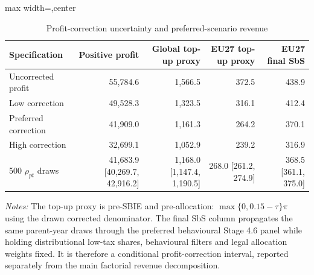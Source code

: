 \begin{table}[H]
\centering
\footnotesize
\setlength{\tabcolsep}{3pt}
\caption{Profit-correction uncertainty and preferred-scenario revenue}
\label{tab:profit_correction_revenue_sensitivity}
\begin{adjustbox}{max width=\textwidth,center}
\begin{tabular}{@{}lrrrr@{}}
\toprule
Specification & Positive profit & Global top-up proxy & EU27 top-up proxy & EU27 final SbS \\
\midrule
Uncorrected profit & 55,784.6 & 1,566.5 & 372.5 & 438.9 \\
Low correction & 49,528.3 & 1,323.5 & 316.1 & 412.4 \\
Preferred correction & 41,909.0 & 1,161.3 & 264.2 & 370.1 \\
High correction & 32,699.1 & 1,052.9 & 239.2 & 316.9 \\
500 $\rho_{pt}$ draws & 41,683.9 [40,269.7, 42,916.2] & 1,168.0 [1,147.4, 1,190.5] & 268.0 [261.2, 274.9] & 368.5 [361.1, 375.0] \\
\bottomrule
\end{tabular}
\end{adjustbox}

\vspace{0.35em}
\noindent\begin{minipage}{\textwidth}
\footnotesize\raggedright\textit{Notes:} The top-up proxy is pre-SBIE and pre-allocation: $\max\{0,0.15-\tau\}\pi$ using the drawn corrected denominator. The final SbS column propagates the same parent-year draws through the preferred behavioural Stage 4.6 panel while holding distributional low-tax shares, behavioural filters and legal allocation weights fixed. It is therefore a conditional profit-correction interval, reported separately from the main factorial revenue decomposition.
\end{minipage}
\end{table}
